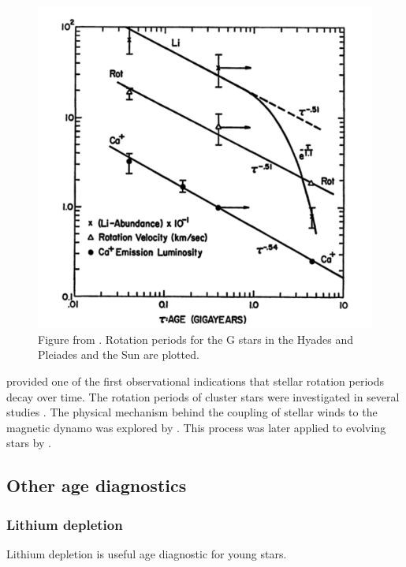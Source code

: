 \begin{figure}
\begin{center}
\includegraphics[width=6in, clip=true]{figures/skumanich.pdf}
\caption{Figure from \citet{skumanich1972}. Rotation periods for the G stars
in the Hyades and Pleiades and the Sun are plotted.}
\label{fig:skumanich}
\end{center}
\end{figure}

\citet{Skumanich1972} provided one of the first observational indications that
stellar rotation periods decay over time.
The rotation periods of cluster stars were investigated in several studies
\citep[\eg][]{Stauffer1987}.
The physical mechanism behind the coupling of stellar winds to the magnetic
dynamo was explored by \citet{Weber1967, Mestel1984}.
This process was later applied to evolving stars by \citet{Kawaler1988}.


\subsection*{Other age diagnostics}

\subsubsection*{Lithium depletion}
Lithium depletion is useful age diagnostic for young stars.

